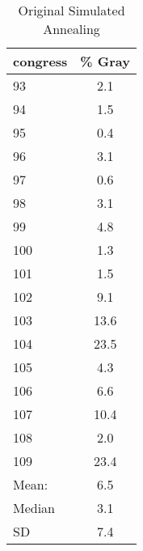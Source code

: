 \documentclass[12pt]{article}
\begin{document}
	\begin{table}[!htbp]
		\centering
		\caption{Original Simulated Annealing}
		\begin{tabular}{l c}
			\hline
			congress & \% Gray \\ 
			\hline
			93 & 2.1 \\ 
			94 & 1.5 \\ 
			95 & 0.4 \\ 
			96 & 3.1 \\ 
			97 & 0.6 \\ 
			98 & 3.1 \\ 
			99 & 4.8 \\ 
			100 & 1.3 \\ 
			101 & 1.5 \\ 
			102 & 9.1 \\ 
			103 & 13.6 \\ 
			104 & 23.5 \\ 
			105 & 4.3 \\ 
			106 & 6.6 \\ 
			107 & 10.4 \\ 
			108 & 2.0 \\ 
			109 & 23.4 \\ 
			\hline
			Mean: & 6.5 \\
			Median & 3.1 \\
			SD & 7.4 \\
			\hline
		\end{tabular}
	\end{table}
	
\end{document}
